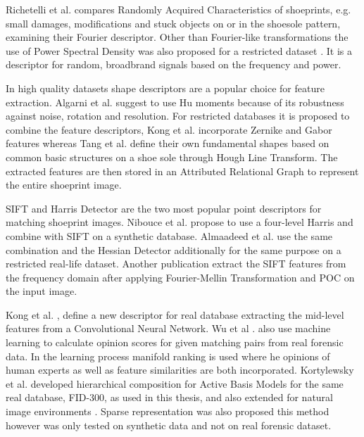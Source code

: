\documentclass[draft,final]{vutinfth} %
\begin{document}
Richetelli et al. \cite{richetelli2017quantitative} compares Randomly Acquired Characteristics of shoeprints, e.g. small damages, modifications and stuck objects on or in the shoesole pattern, examining their Fourier descriptor.
Other than Fourier-like transformations the use of Power Spectral Density was also proposed for a restricted dataset \cite{dardi2009texture}.
It is a descriptor for random, broadbrand signals based on the frequency and power.
\par
In high quality datasets shape descriptors are a popular choice for feature extraction.
Algarni et al. \cite{algarni2008novel} suggest to use Hu moments because of its robustness against noise, rotation and resolution.
For restricted databases it is proposed to combine the feature descriptors, Kong et al. \cite{kong2014novel} incorporate Zernike and Gabor features whereas Tang et al. \cite{tang2010footwear} define their own fundamental shapes based on common basic structures on a shoe sole through Hough Line Transform.
The extracted features are then stored in an Attributed Relational Graph to represent the entire shoeprint image.
\par
SIFT and Harris Detector are the two most popular point descriptors for matching shoeprint images.
Nibouce et al. \cite{nibouche2009rotation} propose to use a four-level Harris and combine with SIFT on a synthetic database.
Almaadeed et al. \cite{almaadeed2015partial} use the same combination and the Hessian Detector additionally for the same purpose on a restricted real-life dataset.
Another publication \cite{richetelli2017classification} extract the SIFT features from the frequency domain after applying Fourier-Mellin Transformation and POC on the input image.
\par
Kong et al. \cite{kong2017cross}, \cite{kong2019cross} define a new descriptor for real database extracting the mid-level features from a Convolutional Neural Network.
Wu et al .\cite{wu2019losgsr} also use machine learning to calculate opinion scores for given matching pairs from real forensic data.
In the learning process manifold ranking is used where he opinions of human experts as well as feature similarities are both incorporated.
Kortylewsky et al. \cite{kortylewski2016probabilistic} developed hierarchical composition for Active Basis Models for the same real database, FID-300, as used in this thesis, and also extended for natural image environments \cite{kortylewski2019greedy}.
Sparse representation was also proposed \cite{alizadeh2017automatic} this method however was only tested on synthetic data and not on real forensic dataset.
\end{document}
